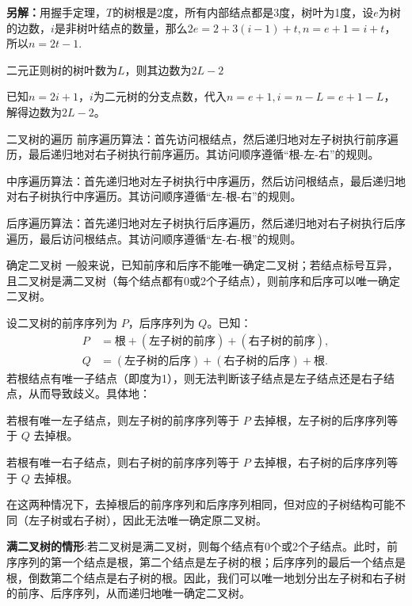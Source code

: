 \textbf{另解：}用握手定理，$T$的树根是2度，所有内部结点都是3度，树叶为1度，设$e$为树的边数，$i$是非树叶结点的数量，那么$2e=2+3(i-1)+t,n=e+1=i+t$，所以$n=2t-1$.
\begin{example}{}{}
    二元正则树的树叶数为$L$，则其边数为$2L-2$
\end{example}
已知$n=2i+1$，$i$为二元树的分支点数，代入$n=e+1,i=n-L=e+1-L$，解得边数为$2L-2$。
\begin{definition}{二叉树的遍历}{}
前序遍历算法：首先访问根结点，然后递归地对左子树执行前序遍历，最后递归地对右子树执行前序遍历。其访问顺序遵循“根-左-右”的规则。

中序遍历算法：首先递归地对左子树执行中序遍历，然后访问根结点，最后递归地对右子树执行中序遍历。其访问顺序遵循“左-根-右”的规则。

后序遍历算法：首先递归地对左子树执行后序遍历，然后递归地对右子树执行后序遍历，最后访问根结点。其访问顺序遵循“左-右-根”的规则。
\end{definition}
\begin{theorem}{确定二叉树}{}
    一般来说，已知前序和后序不能唯一确定二叉树；若结点标号互异，且二叉树是满二叉树（每个结点都有0或2个子结点），则前序和后序可以唯一确定二叉树。
\end{theorem}
设二叉树的前序序列为 $P$，后序序列为 $Q$。已知：
    \begin{align*}
        P &= \text{根} + (\text{左子树的前序}) + (\text{右子树的前序}), \\
        Q &= (\text{左子树的后序}) + (\text{右子树的后序}) + \text{根}.
    \end{align*}
    若根结点有唯一子结点（即度为1），则无法判断该子结点是左子结点还是右子结点，从而导致歧义。具体地：
 
    若根有唯一左子结点，则左子树的前序序列等于 $P$ 去掉根，左子树的后序序列等于 $Q$ 去掉根。
      
    若根有唯一右子结点，则右子树的前序序列等于 $P$ 去掉根，右子树的后序序列等于 $Q$ 去掉根。
    
    在这两种情况下，去掉根后的前序序列和后序序列相同，但对应的子树结构可能不同（左子树或右子树），因此无法唯一确定原二叉树。

    \textbf{ 满二叉树的情形}:若二叉树是满二叉树，则每个结点有0个或2个子结点。此时，前序序列的第一个结点是根，第二个结点是左子树的根；后序序列的最后一个结点是根，倒数第二个结点是右子树的根。因此，我们可以唯一地划分出左子树和右子树的前序、后序序列，从而递归地唯一确定二叉树。

    \vspace{10pt}

